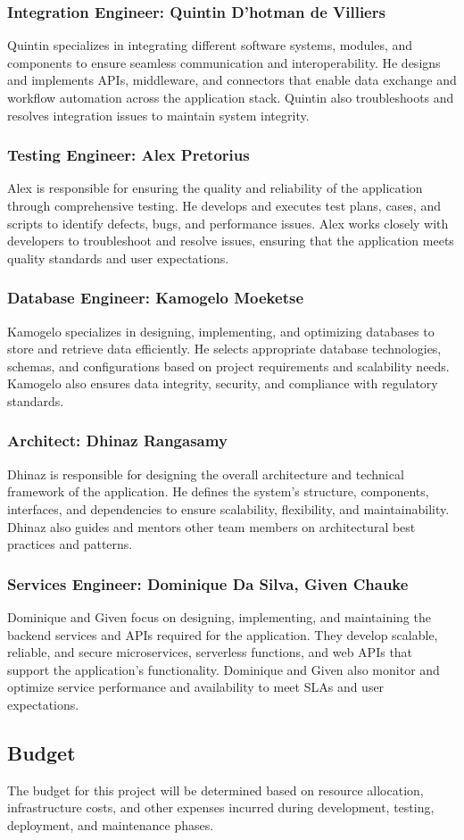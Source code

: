 \documentclass{article}
\begin{document}
\subsubsection{Integration Engineer: Quintin D'hotman de Villiers}
Quintin specializes in integrating different software systems, modules, and components to ensure seamless communication and interoperability. He designs and implements APIs, middleware, and connectors that enable data exchange and workflow automation across the application stack. Quintin also troubleshoots and resolves integration issues to maintain system integrity.
\subsubsection{Testing Engineer: Alex Pretorius}
Alex is responsible for ensuring the quality and reliability of the application through comprehensive testing. He develops and executes test plans, cases, and scripts to identify defects, bugs, and performance issues. Alex works closely with developers to troubleshoot and resolve issues, ensuring that the application meets quality standards and user expectations.
\subsubsection{Database Engineer: Kamogelo Moeketse}
Kamogelo specializes in designing, implementing, and optimizing databases to store and retrieve data efficiently. He selects appropriate database technologies, schemas, and configurations based on project requirements and scalability needs. Kamogelo also ensures data integrity, security, and compliance with regulatory standards.
\subsubsection{Architect: Dhinaz Rangasamy}
Dhinaz is responsible for designing the overall architecture and technical framework of the application. He defines the system's structure, components, interfaces, and dependencies to ensure scalability, flexibility, and maintainability. Dhinaz also guides and mentors other team members on architectural best practices and patterns.
\subsubsection{Services Engineer: Dominique Da Silva, Given Chauke}
Dominique and Given focus on designing, implementing, and maintaining the backend services and APIs required for the application. They develop scalable, reliable, and secure microservices, serverless functions, and web APIs that support the application's functionality. Dominique and Given also monitor and optimize service performance and availability to meet SLAs and user expectations.

\subsection{Budget}
The budget for this project will be determined based on resource allocation, infrastructure costs, and other expenses incurred during development, testing, deployment, and maintenance phases.
\end{document}
